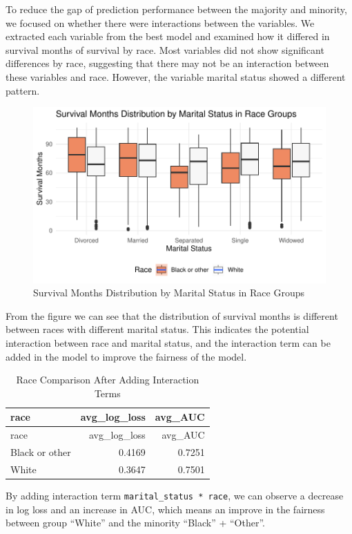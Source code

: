 \documentclass[
]{article}
\begin{document}
To reduce the gap of prediction performance between the majority and
minority, we focused on whether there were interactions between the
variables. We extracted each variable from the best model and examined
how it differed in survival months of survival by race. Most variables
did not show significant differences by race, suggesting that there may
not be an interaction between these variables and race. However, the
variable marital status showed a different pattern.

\begin{figure}
\includegraphics[width=0.9\linewidth]{Appendix_files/figure-latex/race_inter_marital-1} \caption{Survival Months Distribution by Marital Status in Race Groups}\label{fig:race_inter_marital}
\end{figure}

From the figure we can see that the distribution of survival months is
different between races with different marital status. This indicates
the potential interaction between race and marital status, and the
interaction term can be added in the model to improve the fairness of
the model.

\begin{longtable}[]{@{}lrr@{}}
\caption{Race Comparison After Adding Interaction Terms}\tabularnewline
\toprule\noalign{}
race & avg\_log\_loss & avg\_AUC \\
\midrule\noalign{}
\endfirsthead
\toprule\noalign{}
race & avg\_log\_loss & avg\_AUC \\
\midrule\noalign{}
\endhead
\bottomrule\noalign{}
\endlastfoot
Black or other & 0.4169 & 0.7251 \\
White & 0.3647 & 0.7501 \\
\end{longtable}

By adding interaction term \texttt{marital\_status\ *\ race}, we can
observe a decrease in log loss and an increase in AUC, which means an
improve in the fairness between group ``White'' and the minority
``Black'' + ``Other''.
\end{document}
